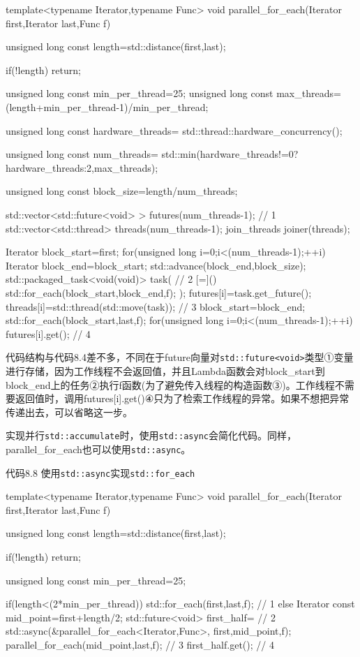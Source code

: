 \begin{cpp}
template<typename Iterator,typename Func>
void parallel_for_each(Iterator first,Iterator last,Func f)
{
  unsigned long const length=std::distance(first,last);

  if(!length)
    return;

  unsigned long const min_per_thread=25;
  unsigned long const max_threads=
    (length+min_per_thread-1)/min_per_thread;

  unsigned long const hardware_threads=
    std::thread::hardware_concurrency();

  unsigned long const num_threads=
    std::min(hardware_threads!=0?hardware_threads:2,max_threads);

  unsigned long const block_size=length/num_threads;

  std::vector<std::future<void> > futures(num_threads-1);  // 1
  std::vector<std::thread> threads(num_threads-1);
  join_threads joiner(threads);

  Iterator block_start=first;
  for(unsigned long i=0;i<(num_threads-1);++i)
  {
    Iterator block_end=block_start;
    std::advance(block_end,block_size);
    std::packaged_task<void(void)> task(  // 2
      [=]()
      {
        std::for_each(block_start,block_end,f);
      });
    futures[i]=task.get_future();
    threads[i]=std::thread(std::move(task));  // 3
    block_start=block_end;
  }
  std::for_each(block_start,last,f);
  for(unsigned long i=0;i<(num_threads-1);++i)
  {
    futures[i].get();  // 4
  }
}
\end{cpp}

代码结构与代码8.4差不多，不同在于future向量对\texttt{std::future<void>}类型①变量进行存储，因为工作线程不会返回值，并且Lambda函数会对block\_start到block\_end上的任务②执行f函数(为了避免传入线程的构造函数③)。工作线程不需要返回值时，调用futures[i].get()④只为了检索工作线程的异常。如果不想把异常传递出去，可以省略这一步。

实现并行\texttt{std::accumulate}时，使用\texttt{std::async}会简化代码。同样，parallel\_for\_each也可以使用\texttt{std::async}。

代码8.8 使用\texttt{std::async}实现\texttt{std::for\_each}

\begin{cpp}
template<typename Iterator,typename Func>
void parallel_for_each(Iterator first,Iterator last,Func f)
{
  unsigned long const length=std::distance(first,last);

  if(!length)
    return;

  unsigned long const min_per_thread=25;

  if(length<(2*min_per_thread))
  {
    std::for_each(first,last,f);  // 1
  }
  else
  {
    Iterator const mid_point=first+length/2;
    std::future<void> first_half=  // 2
      std::async(&parallel_for_each<Iterator,Func>,
                 first,mid_point,f);
    parallel_for_each(mid_point,last,f);  // 3
    first_half.get();  // 4
  }
}
\end{cpp}

